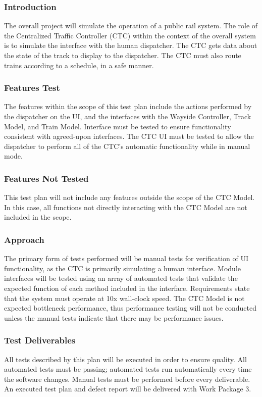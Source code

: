 \documentclass{scrreprt}
\begin{document}
\subsubsection{Introduction}
The overall project will simulate the operation of a public rail system. The role of the Centralized Traffic Controller (CTC) within the context of the overall system is to simulate the interface with the human dispatcher. The CTC gets data about the state of the track to display to the dispatcher. The CTC must also route trains according to a schedule, in a safe manner.

\subsubsection{Features Test}
The features within the scope of this test plan include the actions performed by the dispatcher on the UI, and the interfaces with the Wayside Controller, Track Model, and Train Model. Interface must be tested to ensure functionality consistent with agreed-upon interfaces. The CTC UI must be tested to allow the dispatcher to perform all of the CTC's automatic functionality while in manual mode.

\subsubsection{Features Not Tested}
This test plan will not include any features outside the scope of the CTC Model. In this case, all functions not directly interacting with the CTC Model are not included in the scope.

\subsubsection{Approach}
The primary form of tests performed will be manual tests for verification of UI functionality, as the CTC is primarily simulating a human interface. Module interfaces will be tested using an array of automated tests that validate the expected function of each method included in the interface. Requirements state that the system must operate at 10x wall-clock speed. The CTC Model is not expected bottleneck performance, thus performance testing will not be conducted unless the manual tests indicate that there may be performance issues.

\subsubsection{Test Deliverables}
All tests described by this plan will be executed in order to ensure quality. All automated tests must be passing; automated tests run automatically every time the software changes. Manual tests must be performed before every deliverable. An executed test plan and defect report will be delivered with Work Package 3.
\end{document}
